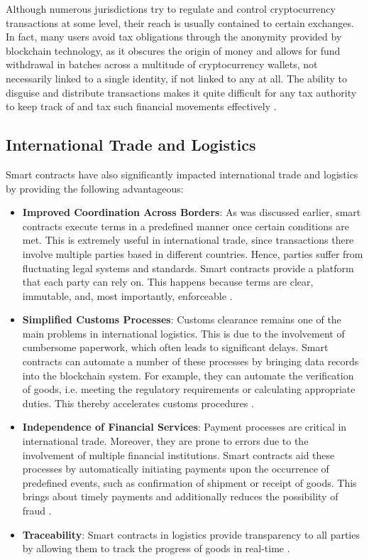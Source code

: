 Although numerous jurisdictions try to regulate and control cryptocurrency transactions at some level, their reach is usually contained to certain exchanges. In fact, many users avoid tax obligations through the anonymity provided by blockchain technology, as it obscures the origin of money and allows for fund withdrawal in batches across a multitude of cryptocurrency wallets, not necessarily linked to a single identity, if not linked to any at all. The ability to disguise and distribute transactions makes it quite difficult for any tax authority to keep track of and tax such financial movements effectively \cite{CongEtAl2023}.

\subsection{International Trade and Logistics}

Smart contracts have also significantly impacted international trade and logistics by providing the following advantageous: 

\begin{itemize}
    \item \textbf{Improved Coordination Across Borders}: As was discussed earlier, smart contracts execute terms in a predefined manner once certain conditions are met. This is extremely useful in international trade, since transactions there involve multiple parties based in different countries. Hence, parties suffer from fluctuating legal systems and standards. Smart contracts provide a platform that each party can rely on. This happens because terms are clear, immutable, and, most importantly, enforceable \cite{AlqarniEtAl2023, MagazzeniEtAl2017}.
    \item \textbf{Simplified Customs Processes}: Customs clearance remains one of the main problems in international logistics. This is due to the involvement of cumbersome paperwork, which often leads to significant delays. Smart contracts can automate a number of these processes by bringing data records into the blockchain system. For example, they can automate the verification of goods, i.e. meeting the regulatory requirements or calculating appropriate duties. This thereby accelerates customs procedures \cite{Law2017, AlqarniEtAl2023}.
    \item \textbf{Independence of Financial Services}: Payment processes are critical in international trade. Moreover, they are prone to errors due to the involvement of multiple financial institutions. Smart contracts aid these processes by automatically initiating payments upon the occurrence of predefined events, such as confirmation of shipment or receipt of goods. This brings about timely payments and additionally reduces the possibility of fraud \cite{AlqarniEtAl2023, MagazzeniEtAl2017}.
    \item \textbf{Traceability}: Smart contracts in logistics provide transparency to all parties by allowing them to track the progress of goods in real-time \cite{AlqarniEtAl2023}.
\end{itemize}

